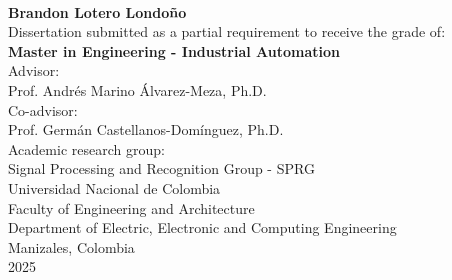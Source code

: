 \begin{center}

  \thispagestyle{empty}
  \vspace*{2cm}

  \begin{spacing}{1.9}
    \textbf{\huge \thesistitle}\\[1.0cm]
  \end{spacing}

  \Large
  \textbf{Brandon Lotero Londoño}\\[3.0cm]

  \small
  Dissertation submitted as a partial requirement to receive the grade of:\\
  \textbf{Master in Engineering - Industrial Automation}\\[1cm]

  Advisor:\\
  Prof. Andrés Marino Álvarez-Meza, Ph.D.\\[0.25cm]

  Co-advisor:\\
  Prof. Germán Castellanos-Domínguez, Ph.D.\\[1cm]

  Academic research group:\\
  Signal Processing and Recognition Group - SPRG\\[1cm]

  Universidad Nacional de Colombia\\
  Faculty of Engineering and Architecture\\
  Department of Electric, Electronic and Computing Engineering\\
  Manizales, Colombia\\
  2025\\

\end{center}

\newpage{\pagestyle{empty}\cleardoublepage}
\newpage

